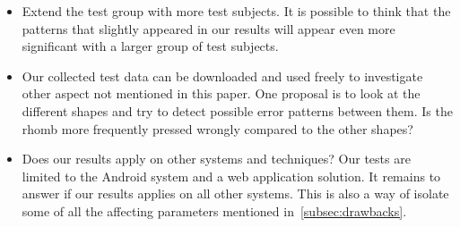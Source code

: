 \documentclass[runningheads,a4paper]{llncs}
\begin{document}
\begin{itemize}
	\item Extend the test group with more test subjects. It is possible to think that the patterns that slightly appeared in our results will appear even more significant with a larger group of test subjects.
	\item Our collected test data can be downloaded and used freely to investigate other aspect not mentioned in this paper. One proposal is to look at the different shapes and try to detect possible error patterns between them. Is the rhomb more frequently pressed wrongly compared to the other shapes?
	\item Does our results apply on other systems and techniques? Our tests are limited to the Android system and a web application solution. It remains to answer if our results applies on all other systems. This is also a way of isolate some of all the affecting parameters mentioned in~\ref{subsec:drawbacks}.
\end{itemize}

%
\nocite{*}  %
% 
%
%

%


\end{document}
